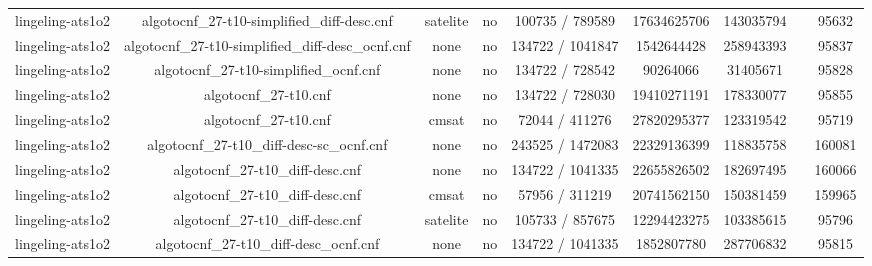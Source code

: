 \begin{appendices}
\begin{table}[p]
\begin{center}
\begin{tabular}{l|cccccccc}
  lingeling-ats1o2               & algotocnf\_27-t10-simplified\_diff-desc.cnf & satelite   & no    & 100735 / 789589 & 17634625706 & 143035794 &            & 95632 \\ %
  lingeling-ats1o2               & algotocnf\_27-t10-simplified\_diff-desc\_ocnf.cnf & none       & no    & 134722 / 1041847 & 1542644428 & 258943393 &            & 95837 \\ %
  lingeling-ats1o2               & algotocnf\_27-t10-simplified\_ocnf.cnf & none       & no    & 134722 / 728542 & 90264066  & 31405671  &            & 95828 \\ %
  lingeling-ats1o2               & algotocnf\_27-t10.cnf          & none       & no    & 134722 / 728030 & 19410271191 & 178330077 &            & 95855 \\ %
  lingeling-ats1o2               & algotocnf\_27-t10.cnf          & cmsat      & no    & 72044 / 411276 & 27820295377 & 123319542 &            & 95719 \\ %
  lingeling-ats1o2               & algotocnf\_27-t10\_diff-desc-sc\_ocnf.cnf & none       & no    & 243525 / 1472083 & 22329136399 & 118835758 &            & 160081 \\ %
  lingeling-ats1o2               & algotocnf\_27-t10\_diff-desc.cnf & none       & no    & 134722 / 1041335 & 22655826502 & 182697495 &            & 160066 \\ %
  lingeling-ats1o2               & algotocnf\_27-t10\_diff-desc.cnf & cmsat      & no    & 57956 / 311219 & 20741562150 & 150381459 &            & 159965 \\ %
  lingeling-ats1o2               & algotocnf\_27-t10\_diff-desc.cnf & satelite   & no    & 105733 / 857675 & 12294423275 & 103385615 &            & 95796 \\ %
  lingeling-ats1o2               & algotocnf\_27-t10\_diff-desc\_ocnf.cnf & none       & no    & 134722 / 1041335 & 1852807780 & 287706832 &            & 95815 \\ %

\end{tabular}
\end{center}
\end{table}
\end{appendices}
